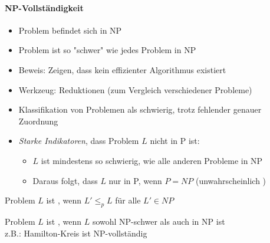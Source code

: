 \documentclass[
    ngerman,
    color=3b,
    dark_mode,
    load_common, %
    summary,
    boxarc,
]{tuda_summary}
\begin{document}
\paragraph{NP-Vollständigkeit}
\begin{itemize}
      \item Problem befindet sich in NP
      \item Problem ist so \string"schwer\string" wie jedes Problem in NP
      \item Beweis: Zeigen, dass kein effizienter Algorithmus existiert
      \item Werkzeug: Reduktionen (zum Vergleich verschiedener Probleme)
\end{itemize}
\begin{definition}\mbox{}
      \begin{itemize}
            \item Klassifikation von Problemen als schwierig, trotz fehlender genauer Zuordnung
            \item \textit{Starke Indikatoren}, dass Problem $L$ nicht in P ist:
                  \begin{itemize}
                        \item $L$ ist mindestens so schwierig, wie alle anderen Probleme in NP
                        \item Daraus folgt, dass $L$ nur in P, wenn $P=NP$ (unwahrscheinlich )
                  \end{itemize}
      \end{itemize}
\end{definition}
\begin{definition}[NP-Schwer]
      Problem $L$ ist , wenn $L' \leq_p L$ für alle $L' \in NP$
\end{definition}
\begin{definition}[NP-Vollständig]
      Problem $L$ ist , wenn $L$ sowohl NP-schwer als auch in NP ist\\
      z.B.: Hamilton-Kreis ist NP-vollständig
\end{definition}

\clearpage
\end{document}
